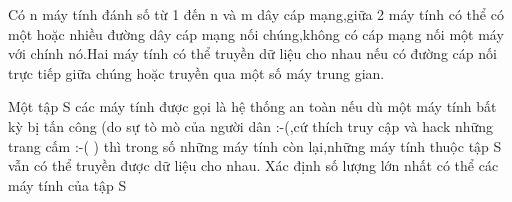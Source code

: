 Có n máy tính đánh số từ 1 đến n và m dây cáp mạng,giữa 2 máy tính có thể có một hoặc nhiều đường dây cáp mạng nối chúng,không có cáp mạng nối một máy với chính nó.Hai máy tính có thể truyền dữ liệu cho nhau nếu có đường cáp nối trực tiếp giữa chúng hoặc truyền qua một số máy trung gian.  

   Một tập S các máy tính được gọi là hệ thống an toàn nếu dù một máy tính bất kỳ bị tấn công (do sự tò mò của người dân :-(,cứ thích truy cập và hack những trang cấm :-( ) thì trong số những máy tính còn lại,những máy tính thuộc tập S vẫn có thể truyền được dữ liệu cho nhau. Xác định số lượng lớn nhất có thể các máy tính của tập S  

\
